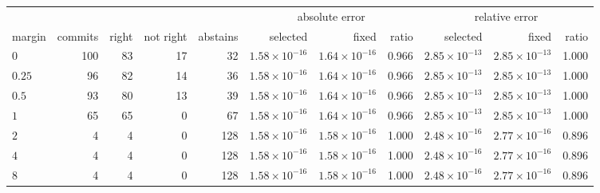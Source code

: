 \begin{tabular}{lrrrr rr rr rr}
\toprule
 & & & & & \multicolumn{3}{c}{absolute error} & \multicolumn{3}{c}{relative error}\\
\cmidrule(lr){6-8}\cmidrule(lr){9-11}
margin & commits & right & not right & abstains & selected & fixed & ratio & selected & fixed & ratio\\
\midrule
$0$ & 100 & 83 & 17 & 32 & $1.58\times10^{-16}$ & $1.64\times10^{-16}$ & 0.966 & $2.85\times10^{-13}$ & $2.85\times10^{-13}$ & 1.000\\
$0.25$ & 96 & 82 & 14 & 36 & $1.58\times10^{-16}$ & $1.64\times10^{-16}$ & 0.966 & $2.85\times10^{-13}$ & $2.85\times10^{-13}$ & 1.000\\
$0.5$ & 93 & 80 & 13 & 39 & $1.58\times10^{-16}$ & $1.64\times10^{-16}$ & 0.966 & $2.85\times10^{-13}$ & $2.85\times10^{-13}$ & 1.000\\
$1$ & 65 & 65 & 0 & 67 & $1.58\times10^{-16}$ & $1.64\times10^{-16}$ & 0.966 & $2.85\times10^{-13}$ & $2.85\times10^{-13}$ & 1.000\\
$2$ & 4 & 4 & 0 & 128 & $1.58\times10^{-16}$ & $1.58\times10^{-16}$ & 1.000 & $2.48\times10^{-16}$ & $2.77\times10^{-16}$ & 0.896\\
$4$ & 4 & 4 & 0 & 128 & $1.58\times10^{-16}$ & $1.58\times10^{-16}$ & 1.000 & $2.48\times10^{-16}$ & $2.77\times10^{-16}$ & 0.896\\
$8$ & 4 & 4 & 0 & 128 & $1.58\times10^{-16}$ & $1.58\times10^{-16}$ & 1.000 & $2.48\times10^{-16}$ & $2.77\times10^{-16}$ & 0.896\\
\bottomrule
\end{tabular}
